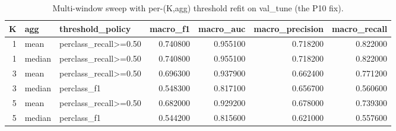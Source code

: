 \begin{table}[htbp]\centering\caption{Multi-window sweep with per-(K,agg) threshold refit on val_tune (the P10 fix).}\label{tab:mw}
\begin{tabular}{rllrrrr}
\toprule
K & agg & threshold_policy & macro_f1 & macro_auc & macro_precision & macro_recall \\
\midrule
1 & mean & perclass_recall>=0.50 & 0.740800 & 0.955100 & 0.718200 & 0.822000 \\
1 & median & perclass_recall>=0.50 & 0.740800 & 0.955100 & 0.718200 & 0.822000 \\
3 & mean & perclass_recall>=0.50 & 0.696300 & 0.937900 & 0.662400 & 0.771200 \\
3 & median & perclass_f1 & 0.548300 & 0.817100 & 0.656700 & 0.560600 \\
5 & mean & perclass_recall>=0.50 & 0.682000 & 0.929200 & 0.678000 & 0.739300 \\
5 & median & perclass_f1 & 0.544200 & 0.815600 & 0.621000 & 0.557600 \\
\bottomrule
\end{tabular}
\end{table}
